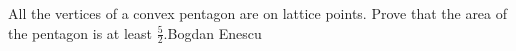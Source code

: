 All the vertices of a convex pentagon are on lattice points. Prove that the area of the pentagon is at least $\frac{5}{2}$.Bogdan Enescu